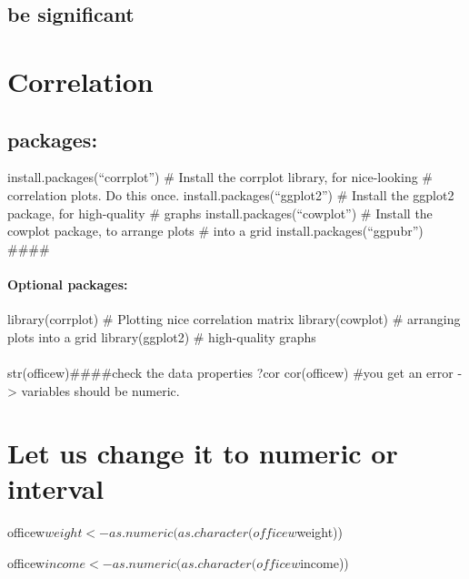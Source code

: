 \documentclass[
]{article}
\begin{document}
\hypertarget{be-significant}{%
\subsection{be significant}\label{be-significant}}

\hypertarget{correlation}{%
\section{Correlation}\label{correlation}}

\hypertarget{packages}{%
\subsection{packages:}\label{packages}}

install.packages(``corrplot'') \# Install the corrplot library, for
nice-looking \# correlation plots. Do this once.
install.packages(``ggplot2'') \# Install the ggplot2 package, for
high-quality \# graphs install.packages(``cowplot'') \# Install the
cowplot package, to arrange plots \# into a grid
install.packages(``ggpubr'') \#\#\#\#

\hypertarget{optional-packages}{%
\paragraph{Optional packages:}\label{optional-packages}}

library(corrplot) \# Plotting nice correlation matrix library(cowplot)
\# arranging plots into a grid library(ggplot2) \# high-quality graphs

\hypertarget{section-19}{%
\paragraph{}\label{section-19}}

str(officew)\#\#\#\#check the data properties ?cor cor(officew) \#you
get an error -\textgreater{} variables should be numeric.

\hypertarget{let-us-change-it-to-numeric-or-interval-1}{%
\section{Let us change it to numeric or
interval}\label{let-us-change-it-to-numeric-or-interval-1}}

officew\(weight <-as.numeric(as.character(officew\)weight))

officew\(income <- as.numeric(as.character(officew\)income))
\end{document}

